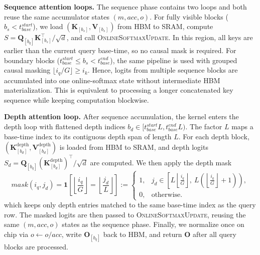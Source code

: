 \documentclass[]{bytedance_seed}
\newcommand{\myPara}[1]{\vspace{.05in}\noindent\textbf{#1.}}
\begin{document}
\myPara{Sequence attention loops}
The sequence phase contains two loops and both reuse the same accumulator states $(m,acc,o)$.
For fully visible blocks ($b_s<t_{base}^{start}$), we load $(\mathbf{K}_{[b_s]},\mathbf{V}_{[b_s]})$ from HBM to SRAM, compute
$S=\mathbf{Q}_{[b_q]}\mathbf{K}_{[b_s]}^\top/\sqrt{d}$, and call \textsc{OnlineSoftmaxUpdate}.
In this region, all keys are earlier than the current query base-time, so no causal mask is required.
For boundary blocks ($t_{base}^{start}\le b_s<t_{base}^{end}$), the same pipeline is used with grouped causal masking
$\lfloor i_q/G\rfloor\ge i_k$.
Hence, logits from multiple sequence blocks are accumulated into one online-softmax state without intermediate HBM materialization.
This is equivalent to processing a longer concatenated key sequence while keeping computation blockwise.

\myPara{Depth attention loop}
After sequence accumulation, the kernel enters the depth loop with flattened depth indices
$b_d\in[t_{base}^{start}L,t_{base}^{end}L)$.
The factor $L$ maps a base-time index to its contiguous depth span of length $L$.
For each depth block, $(\mathbf{K}^{\text{depth}}_{[b_d]},\mathbf{V}^{\text{depth}}_{[b_d]})$ is loaded from HBM to SRAM, and depth logits
$S_d=\mathbf{Q}_{[b_q]}(\mathbf{K}^{\text{depth}}_{[b_d]})^\top/\sqrt{d}$ are computed.
We then apply the depth mask
\[
mask(i_q,j_d)=\mathbf{1}\!\left[\left\lfloor\frac{i_q}{G}\right\rfloor=\left\lfloor\frac{j_d}{L}\right\rfloor\right]
:=
\begin{cases}
1, & j_d \in \left[L\left\lfloor\frac{i_q}{G}\right\rfloor,\ L\left(\left\lfloor\frac{i_q}{G}\right\rfloor+1\right)\right), \\
0, & \text{otherwise}.
\end{cases}
\]
which keeps only depth entries matched to the same base-time index as the query row.
The masked logits are then passed to \textsc{OnlineSoftmaxUpdate}, reusing the same $(m,acc,o)$ states as the sequence phase.
Finally, we normalize once on chip via $o\leftarrow o/acc$, write $\mathbf{O}_{[b_q]}$ back to HBM, and return $\mathbf{O}$ after all query blocks are processed.
\end{document}
